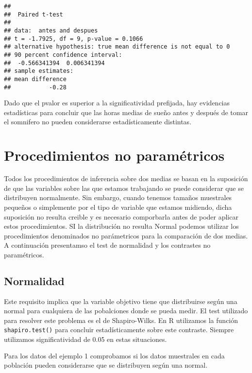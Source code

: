 \documentclass[
]{book}
\begin{document}
\begin{verbatim}
## 
##  Paired t-test
## 
## data:  antes and despues
## t = -1.7925, df = 9, p-value = 0.1066
## alternative hypothesis: true mean difference is not equal to 0
## 90 percent confidence interval:
##  -0.566341394  0.006341394
## sample estimates:
## mean difference 
##           -0.28
\end{verbatim}

Dado que el pvalor es superior a la significatividad prefijada, hay evidencias estadísticas para concluir que las horas medias de sueño antes y después de tomar el somnifero no pueden considerarse estadísticamente distintas.

\hypertarget{procedimientos-no-paramuxe9tricos}{%
\section{Procedimientos no paramétricos}\label{procedimientos-no-paramuxe9tricos}}

Todos los procedimientos de inferencia sobre dos medias se basan en la suposición de que las variables sobre las que estamos trabajando se puede considerar que se distribuyen normalmente. Sin embargo, cuando tenemos tamaños muestrales pequeños o simplemente por el tipo de variable que estamos midiendo, dicha suposición no resulta creible y es necesario comporbarla antes de poder aplicar estos procedimientos. SI la distribución no resulta Normal podemos utilizar los procedimientos denominados no parámetricos para la comparación de dos medias. A continuación presentamso el test de normalidad y los contrastes no paramétricos.

\hypertarget{normalidad}{%
\subsection{Normalidad}\label{normalidad}}

Este requisito implica que la variable objetivo tiene que distribuirse según una normal para cualquiera de las pobalciones donde se pueda medir. El test utilizado para resolver este problema es el de Shapiro-Wilks. En R utilizamos la función \texttt{shapiro.test()} para concluir estadísticamente sobre este contraste. Siempre utilizamos significatividad de 0.05 en estas situaciones.

Para los datos del ejemplo 1 comprobamos si los datos muestrales en cada población pueden considerarse que se distribuyen según una normal.
\end{document}
